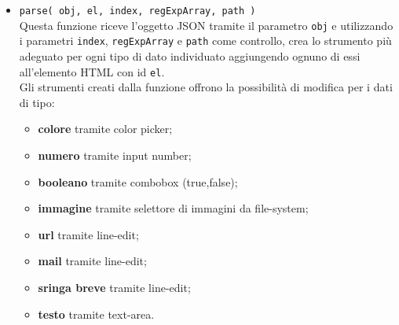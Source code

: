 \begin{itemize}
	\item \texttt{parse( obj, el, index, regExpArray, path )}\\
	Questa funzione riceve l'oggetto JSON tramite il parametro \texttt{obj} e utilizzando i parametri \texttt{index}, \texttt{regExpArray} e \texttt{path} come controllo, crea lo strumento più adeguato per ogni tipo di dato individuato aggiungendo ognuno di essi all'elemento HTML con id \texttt{el}.\\
	Gli strumenti creati dalla funzione offrono la possibilità di modifica per i dati di tipo:
	\begin{itemize}
		\item \textbf{colore} tramite color picker;
		\item \textbf{numero} tramite input number;
		\item \textbf{booleano} tramite combobox (true,false);
		\item \textbf{immagine} tramite selettore di immagini da file-system;
		\item \textbf{url} tramite line-edit;
		\item \textbf{mail} tramite line-edit;
		\item \textbf{sringa breve} tramite line-edit;
		\item \textbf{testo} tramite text-area.
	\end{itemize}
\end{itemize}